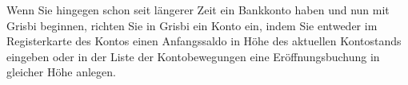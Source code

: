 Wenn Sie hingegen schon seit längerer Zeit ein Bankkonto haben und nun mit Grisbi beginnen, richten Sie in Grisbi ein Konto ein, indem Sie entweder im Registerkarte  des Kontos einen Anfangssaldo in Höhe des aktuellen Kontostands eingeben oder in der Liste der Kontobewegungen eine Eröffnungsbuchung in gleicher Höhe anlegen.

